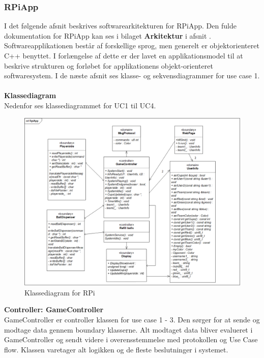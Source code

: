 \documentclass[Rapport/Rapport_main.tex]{subfiles}
\begin{document}
\subsubsection{RPiApp}
I det følgende afsnit beskrives softwarearkitekturen for RPiApp. Den fulde dokumentation for RPiApp kan ses i bilaget \textbf{Arkitektur} i afsnit . \\
Softwareapplikationen består af forskellige sprog, men generelt er objektorienteret C++ benyttet. I forlængelse af dette er der lavet en applikationsmodel til at beskrive strukturen og forløbet for applikationens objekt-orienteret softwaresystem. I de næste afsnit ses klasse- og sekvensdiagrammer for use case 1. \\\\
\textbf{Klassediagram}\\
Nedenfor ses klassediagrammet for UC1 til UC4. 
\begin{figure}[H]
    \centering
    \includegraphics[width=\textwidth]{Arkitektur/Softwarearkitektur/Applikationsmodel/RPi/graphics_RPi/Class.png}
    \caption{Klassediagram for RPi}
    \label{fig:CD_RPI_RAP}
\end{figure}
\textbf{Controller:  GameController}\\
GameController er controller klassen for use case 1 - 3. Den sørger for at sende og modtage data gennem boundary klasserne. Alt modtaget data bliver evalueret i GameController og sendt videre i overensstemmelse med protokollen og Use Case flow. Klassen varetager alt logikken og de fleste beslutninger i systemet.\\\\
\end{document}
